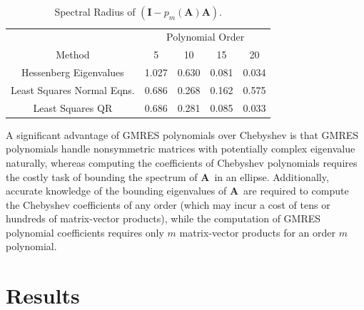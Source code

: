 \documentclass[10pt]{article}
\newcommand{\bA}{\ensuremath{\mathbf{A}}}
\newcommand{\bI}{\ensuremath{\mathbf{I}}}
\begin{document}
\begin{table}
\centering
\caption{Spectral Radius of $\left( \bI - p_m(\bA) \bA \right)$.}
\label{tab:gmres_poly}
\begin{tabular}{ccccc}
\toprule
& \multicolumn{4}{c}{Polynomial Order} \\
\cmidrule(r){2-5}
Method & 5 & 10 & 15 & 20 \\
\midrule
Hessenberg Eigenvalues     & 1.027 & 0.630 & 0.081 & 0.034 \\
Least Squares Normal Eqns. & 0.686 & 0.268 & 0.162 & 0.575 \\
Least Squares QR           & 0.686 & 0.281 & 0.085 & 0.033 \\
\bottomrule
\end{tabular}
\end{table}

A significant advantage of GMRES polynomials over Chebyshev is that
GMRES polynomials handle nonsymmetric matrices with potentially complex
eigenvalue naturally, whereas computing the coefficients of
Chebyshev polynomials requires the costly task of bounding the spectrum
of \bA\ in an ellipse.  Additionally, accurate knowledge of the bounding eigenvalues
of \bA\ are required to compute the Chebyshev coefficients of any order
(which may incur a cost of tens or hundreds of matrix-vector products),
while the computation of GMRES polynomial coefficients requires only
$m$ matrix-vector products for an order $m$ polynomial.

\section{Results}
\label{sec:results}
\end{document}
